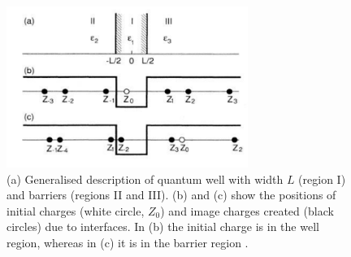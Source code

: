 \begin{figure}[h!]
\centering
\includegraphics[width=0.7\textwidth]{Fig17}
\caption{(a) Generalised description of quantum well with width $L$ (region I) and barriers (regions II and III). (b) and (c) show the positions of initial charges (white circle, $Z_0$) and image charges created (black circles) due to interfaces. In (b) the initial charge is in the well region, whereas in (c) it is in the barrier region \cite{Kumagai1989}.}
\label{2Fig17}
\end{figure}

